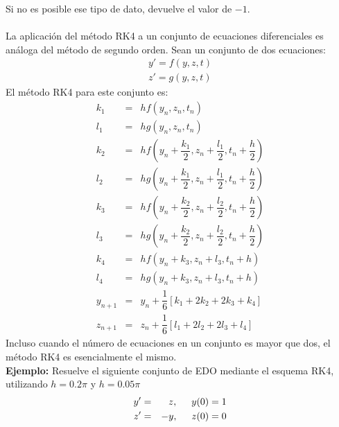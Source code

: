 \documentclass[11pt]{article}
\begin{document}
Si no es posible ese tipo de dato, devuelve el valor de $-1$.
\\
\\
La aplicación del método RK4 a un conjunto de ecuaciones diferenciales es análoga del método de segundo orden. Sean un conjunto de dos ecuaciones:
\begin{eqnarray}
y'=f(y,z,t) \nonumber \\
z'=g(y,z,t)
\end{eqnarray}
El método RK4 para este conjunto es:
\begin{eqnarray}
k_{1} & = & hf(y_{n},z_{n},t_{n}) \nonumber \\
l_{1} & = & hg(y_{n},z_{n},t_{n}) \nonumber \\
k_{2} & = & hf \left( y_{n} + \dfrac {k_{1}}{2},z_{n}+ \dfrac {l_{1}}{2},t_{n}+ \dfrac{h}{2}  \right)  \nonumber \\
l_{2} & = & hg \left( y_{n} + \dfrac {k_{1}}{2},z_{n}+ \dfrac {l_{1}}{2},t_{n}+ \dfrac{h}{2}  \right)  \nonumber \\
k_{3} & = & hf \left( y_{n} + \dfrac {k_{2}}{2},z_{n}+ \dfrac {l_{2}}{2},t_{n}+ \dfrac{h}{2}  \right)  \nonumber \\
l_{3} & = & hg \left( y_{n} + \dfrac {k_{2}}{2},z_{n}+ \dfrac {l_{2}}{2},t_{n}+ \dfrac{h}{2}  \right)  \nonumber \\
k_{4} & = & hf \left( y_{n}+k_{3},z_{n}+l_{3},t_{n}+h \right) \nonumber \\
l_{4} & = & hg \left( y_{n}+k_{3},z_{n}+l_{3},t_{n}+h \right) \\
y_{n+1} & = & y_{n} + \dfrac{1}{6} \left[k_{1}+2k_{2}+2k_{3}+k_{4} \right] \\
z_{n+1} & = & z_{n} + \dfrac{1}{6} \left[l_{1}+2l_{2}+2l_{3}+l_{4} \right]
\end{eqnarray}
Incluso cuando el número de ecuaciones en un conjunto es mayor que dos, el método RK4 es esencialmente el mismo.
\\
\textbf{Ejemplo: } Resuelve el siguiente conjunto de EDO mediante el esquema RK4, utilizando $h=0.2 \pi$ y $h=0.05 \pi$
\begin{eqnarray}
y' & = & z, \hspace{0.5cm} y(0)=1 \nonumber \\
z' & = & -y, \hspace{0.5cm} z(0)=0 \nonumber
\end{eqnarray}
\end{document}
